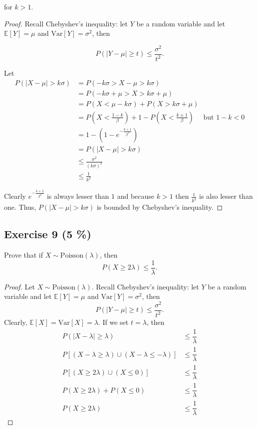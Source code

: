 \documentclass[11pt]{article}
\theoremstyle{definition}
\theoremstyle{remark}
\theoremstyle{remark}
\newcommand{\E}[1]{\mathbb{E}\left[#1 \right]}
\newcommand{\V}[1]{\mathrm{Var}\left[#1 \right]}
\begin{document}
for $k>1$.

\begin{proof}
  Recall Chebyshev's inequality: let $Y$ be a random variable and let
  $\E{Y}=\mu$ and $\V{Y}=\sigma^2$, then

\[
  P(|Y-\mu|\geq t)\leq\dfrac{\sigma^2}{t^2}.
\]

Let
\begin{align*}
  P(|X-\mu|>k \sigma) &=P(-k \sigma>X-\mu>k \sigma) \\
                      &=P(-k \sigma+\mu>X>k \sigma+\mu) \\
                      &=P(X<\mu-k \sigma)+P(X>k \sigma+\mu) \\
                      &=P\left(X<\frac{1-k}{\beta}\right)+1-P\left(X<\frac{k+1}{\beta}\right) \quad \text { but } 1-k<0\\
                      &=1-\left(1-e^{-\frac{k+1}{\beta^{2}}}\right) \\
                      &=P(|X-\mu|>k \sigma)\\
                      &\leq \frac{\sigma^{2}}{(k \sigma)^{2}} \\
                      &\leq \frac{1}{k^{2}}
\end{align*}

Clearly $e^{-\frac{k+2}{\beta^{2}}}$ is always lesser than $1$ and
because $k>1$ then $\frac{1}{k^{2}}$ is also lesser than one. Thus,
$P(|X-\mu|>k \sigma)$ is bounded by Chebyshev's inequality.
\end{proof}


\subsection*{Exercise 9 (5 \%)}
Prove that if $X\sim \mathrm{Poisson}(\lambda)$, then
\[
  P(X\geq 2\lambda)\leq \dfrac{1}{\lambda}.
\]
\begin{proof}
  Let $X\sim \mathrm{Poisson}(\lambda)$. Recall Chebyshev's
  inequality: let $Y$ be a random variable and let $\E{Y}=\mu$ and
  $\V{Y}=\sigma^2$, then
\[
  P(|Y-\mu|\geq t)\leq\dfrac{\sigma^2}{t^2}.
\]
Clearly, $\E{X}=\V{X}=\lambda$. If we set $t=\lambda$, then
\[
\begin{split}
  P(|X-\lambda|\geq\lambda)&\leq\dfrac{1}{\lambda}\\
  P\left[(X-\lambda\geq\lambda)\cup(X-\lambda\leq-\lambda)\right]&\leq\dfrac{1}{\lambda}\\
  P\left[(X\geq2\lambda)\cup(X\leq0)\right]&\leq\dfrac{1}{\lambda}\\
  P(X\geq2\lambda)+P(X\leq0)&\leq\dfrac{1}{\lambda}\\
  P(X\geq 2\lambda)&\leq \dfrac{1}{\lambda}
\end{split}
\]
\end{proof}
\end{document}
